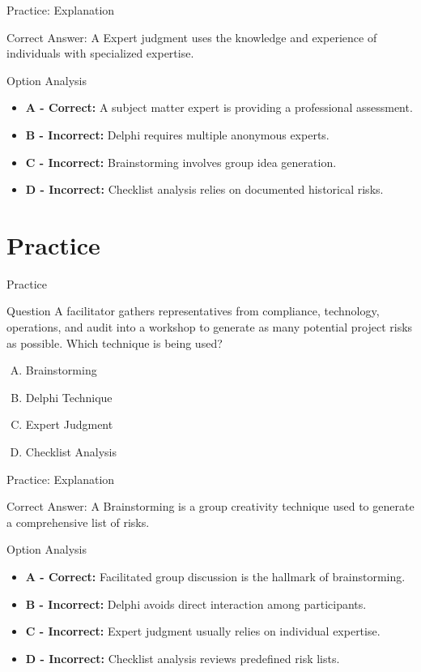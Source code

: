 \documentclass{beamer}
\begin{document}
	\begin{frame}{Practice: Explanation}
		\begin{block}{Correct Answer: A}
			Expert judgment uses the knowledge and experience of individuals with specialized expertise.
		\end{block}
		\begin{block}{Option Analysis}
			\begin{itemize}
				\item \textbf{A - Correct:} A subject matter expert is providing a professional assessment.
				\item \textbf{B - Incorrect:} Delphi requires multiple anonymous experts.
				\item \textbf{C - Incorrect:} Brainstorming involves group idea generation.
				\item \textbf{D - Incorrect:} Checklist analysis relies on documented historical risks.
			\end{itemize}
		\end{block}
	\end{frame}
	
	\section{Practice}
	
	\begin{frame}{Practice}
		\begin{block}{Question}
			A facilitator gathers representatives from compliance, technology, operations, and audit into a workshop to generate as many potential project risks as possible. Which technique is being used?
		\end{block}
		\begin{enumerate}[(A)]
			\item Brainstorming
			\item Delphi Technique
			\item Expert Judgment
			\item Checklist Analysis
		\end{enumerate}
	\end{frame}
	
	\begin{frame}{Practice: Explanation}
		\begin{block}{Correct Answer: A}
			Brainstorming is a group creativity technique used to generate a comprehensive list of risks.
		\end{block}
		\begin{block}{Option Analysis}
			\begin{itemize}
				\item \textbf{A - Correct:} Facilitated group discussion is the hallmark of brainstorming.
				\item \textbf{B - Incorrect:} Delphi avoids direct interaction among participants.
				\item \textbf{C - Incorrect:} Expert judgment usually relies on individual expertise.
				\item \textbf{D - Incorrect:} Checklist analysis reviews predefined risk lists.
			\end{itemize}
		\end{block}
	\end{frame}
	
\end{document}
